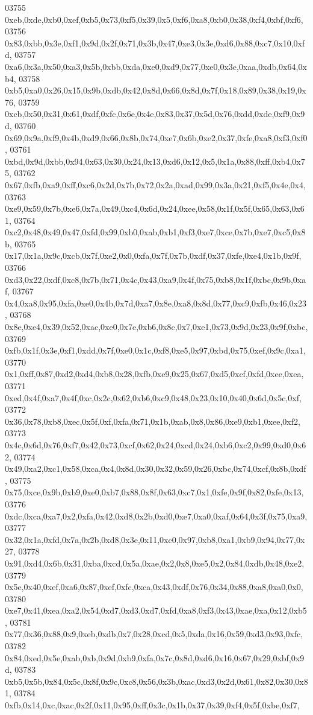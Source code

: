 \begin{DoxyCode}
03755   0xeb,0xde,0xb0,0xef,0xb5,0x73,0xf5,0x39,0x5,0xf6,0xa8,0xb0,0x38,0xf4,0xbf,0xf6,
03756   0x83,0xbb,0x3e,0xf1,0x9d,0x2f,0x71,0x3b,0x47,0xe3,0x3e,0xd6,0x88,0xc7,0x10,0xfd,
03757   0xa6,0x3a,0x50,0xa3,0x5b,0xbb,0xda,0xe0,0xd9,0x77,0xe0,0x3e,0xaa,0xdb,0x64,0xb4,
03758   0xb5,0xa0,0x26,0x15,0x9b,0xdb,0x42,0x8d,0x66,0x8d,0x7f,0x18,0x89,0x38,0x19,0x76,
03759   0xcb,0x50,0x31,0x61,0xdf,0xfc,0x6e,0x4e,0x83,0x37,0x5d,0x76,0xdd,0xde,0xf9,0x9d,
03760   0x69,0x9a,0xf9,0x4b,0xd9,0x66,0x8b,0x74,0xe7,0x6b,0xe2,0x37,0xfe,0xa8,0xf3,0xf0,
03761   0xbd,0x9d,0xbb,0x94,0x63,0x30,0x24,0x13,0xd6,0x12,0x5,0x1a,0x88,0xff,0xb4,0x75,
03762   0x67,0xfb,0xa9,0xff,0xc6,0x2d,0x7b,0x72,0x2a,0xad,0x99,0x3a,0x21,0xf5,0x4e,0x4,
03763   0xe9,0x59,0x7b,0xe6,0x7a,0x49,0xc4,0x6d,0x24,0xee,0x58,0x1f,0x5f,0x65,0x63,0x61,
03764   0xc2,0x48,0x49,0x47,0xfd,0x99,0xb0,0xab,0xb1,0xf3,0xe7,0xce,0x7b,0xe7,0xc5,0x8b,
03765   0x17,0x1a,0x9c,0xcb,0x7f,0xe2,0x0,0xfa,0x7f,0x7b,0xdf,0x37,0xfe,0xe4,0x1b,0x9f,
03766   0xd3,0x22,0xdf,0xc8,0x7b,0x71,0x4c,0x43,0xa9,0x4f,0x75,0xb8,0x1f,0xbc,0x9b,0xaf,
03767   0x4,0xa8,0x95,0xfa,0xe0,0x4b,0x7d,0xa7,0x8e,0xa8,0x8d,0x77,0xc9,0xfb,0x46,0x23,
03768   0x8e,0xe4,0x39,0x52,0xac,0xe0,0x7e,0xb6,0x8c,0x7,0xe1,0x73,0x9d,0x23,0x9f,0xbc,
03769   0xfb,0x1f,0x3e,0xf1,0xdd,0x7f,0xe0,0x1c,0xf8,0xe5,0x97,0xbd,0x75,0xef,0x9c,0xa1,
03770   0x1,0xff,0x87,0xd2,0xd4,0xb8,0x28,0xfb,0xe9,0x25,0x67,0xd5,0xcf,0xfd,0xee,0xea,
03771   0xed,0x4f,0xa7,0x4f,0xc,0x2c,0x62,0xb6,0xc9,0x48,0x23,0x10,0x40,0x6d,0x5c,0xf,
03772   0x36,0x78,0xb8,0xec,0x5f,0xf,0xfa,0x71,0x1b,0xab,0x8,0x86,0xe9,0xb1,0xee,0xf2,
03773   0x4c,0x6d,0x76,0xf7,0x42,0x73,0xcf,0x62,0x24,0xcd,0x24,0xb6,0xc2,0x99,0xd0,0x62,
03774   0x49,0xa2,0xc1,0x58,0xca,0x4,0x8d,0x30,0x32,0x59,0x26,0xbc,0x74,0xcf,0x8b,0xdf,
03775   0x75,0xce,0x9b,0xb9,0xe0,0xb7,0x88,0x8f,0x63,0xc7,0x1,0xfe,0x9f,0x82,0xfe,0x13,
03776   0xdc,0xca,0xa7,0x2,0xfa,0x42,0xd8,0x2b,0xd0,0xe7,0xa0,0xaf,0x64,0x3f,0x75,0xa9,
03777   0x32,0x1a,0xfd,0x7a,0x2b,0xd8,0x3e,0x11,0xc0,0x97,0xb8,0xa1,0xb9,0x94,0x77,0x27,
03778   0x91,0xd4,0x6b,0x31,0xba,0xcd,0x5a,0xae,0x2,0x8,0xe5,0x2,0x84,0xdb,0x48,0xe2,
03779   0x5e,0x40,0xef,0xa6,0x87,0xef,0xfc,0xca,0x43,0xdf,0x76,0x34,0x88,0xa8,0xa0,0x0,
03780   0xe7,0x41,0xea,0xa2,0x54,0xd7,0xd3,0xd7,0xfd,0xa8,0xf3,0x43,0xae,0xa,0x12,0xb5,
03781   0x77,0x36,0x88,0x9,0xeb,0xdb,0x7,0x28,0xcd,0x5,0xda,0x16,0x59,0xd3,0x93,0xfc,
03782   0x84,0xed,0x5e,0xab,0xb,0x9d,0xb9,0xfa,0x7c,0x8d,0xd6,0x16,0x67,0x29,0xbf,0x9d,
03783   0xb5,0x5b,0x84,0x5c,0x8f,0x9c,0xc8,0x56,0x3b,0xac,0xd3,0x2d,0x61,0x82,0x30,0x81,
03784   0xfb,0x14,0xc,0xac,0x2f,0x11,0x95,0xff,0x3c,0x1b,0x37,0x39,0xf4,0x5f,0xbe,0xf7,

\end{DoxyCode}
